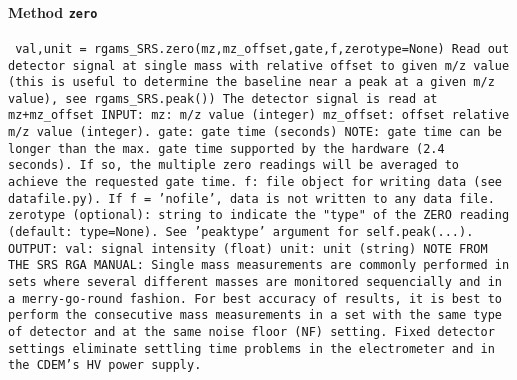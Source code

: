 \paragraph{Method \texttt{zero}}
\vspace{1ex}
\texttt{\newline
val,unit = rgams_SRS.zero(mz,mz_offset,gate,f,zerotype=None)\newline
\newline
Read out detector signal at single mass with relative offset to given m/z value (this is useful to determine the baseline near a peak at a given m/z value), see rgams_SRS.peak())\newline
The detector signal is read at mz+mz_offset\newline
\newline
INPUT:\newline
mz: m/z value (integer)\newline
mz_offset: offset relative m/z value (integer).\newline
gate: gate time (seconds) NOTE: gate time can be longer than the max. gate time supported by the hardware (2.4 seconds). If so, the multiple zero readings will be averaged to achieve the requested gate time.\newline
f: file object for writing data (see datafile.py). If f = 'nofile', data is not written to any data file.\newline
zerotype (optional): string to indicate the "type" of the ZERO reading (default: type=None). See 'peaktype' argument for self.peak(...).\newline
\newline
OUTPUT:\newline
val: signal intensity (float)\newline
unit: unit (string)\newline
\newline
NOTE FROM THE SRS RGA MANUAL:\newline
Single mass measurements are commonly performed in sets\newline
where several different masses are monitored sequencially\newline
and in a merry-go-round fashion.\newline
For best accuracy of results, it is best to perform the consecutive\newline
mass measurements in a set with the same type of detector\newline
and at the same noise floor (NF) setting.\newline
Fixed detector settings eliminate settling time problems\newline
in the electrometer and in the CDEM's HV power supply.\newline
\newline
}

